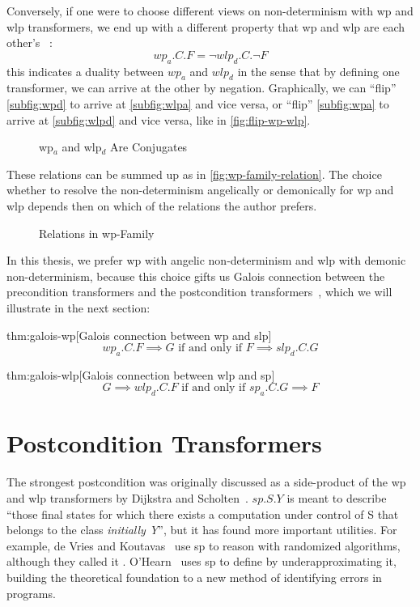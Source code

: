 Conversely, if one were to choose different views on non-determinism with wp and wlp transformers, we end up with a different property that wp and wlp are each other's ~\cite{dijkstra76,zhang22}: 
$$ wp_a.C.F = \neg wlp_d.C.\neg F $$ 
this indicates a duality between $wp_a$ and $wlp_d$ in the sense that by defining one transformer, we can arrive at the other by negation. 
Graphically, we can ``flip'' \autoref{subfig:wpd} to arrive at \autoref{subfig:wlpa} and vice versa, or ``flip'' \autoref{subfig:wpa} to arrive at \autoref{subfig:wlpd} and vice versa, like in \autoref{fig:flip-wp-wlp}. 
\begin{figure}[ht]
	\centering
	
	\caption{wp$_a$ and wlp$_d$ Are Conjugates}
	\label{fig:flip-wp-wlp}
\end{figure}

These relations can be summed up as in \autoref{fig:wp-family-relation}. 
The choice whether to resolve the non-determinism angelically or demonically for wp and wlp depends then on which of the relations the author prefers. 
\begin{figure}[ht]
	\centering
	
	\caption{Relations in wp-Family}
	\label{fig:wp-family-relation}
\end{figure}

In this thesis, we prefer wp with angelic non-determinism and wlp with demonic non-determinism, because this choice gifts us Galois connection between the precondition transformers and the postcondition transformers~\cite{zhang22}, which we will illustrate in the next section: 
\begin{theorem}{thm:galois-wp}[Galois connection between wp and slp]
	$$wp_a.C.F \implies G \text{ if and only if }F\implies slp_d.C.G$$
\end{theorem}

\begin{theorem}{thm:galois-wlp}[Galois connection between wlp and sp]
	$$G \implies wlp_d.C.F \text{ if and only if } sp_a.C.G\implies F$$
\end{theorem}

\section{Postcondition Transformers}
The strongest postcondition was originally discussed as a side-product of the wp and wlp transformers by Dijkstra and Scholten~\cite{dijkstra90}. 
$sp.S.Y$ is meant to describe ``those final states for which there exists a computation under control of S that belongs to the class \textit{initially Y}'', but it has found more important utilities. 
For example, de Vries and Koutavas~\cite{vries11} use sp to reason with randomized algorithms, although they called it . 
O'Hearn~\cite{ohearn2020IncorrectnessLogic} uses sp to define  by underapproximating it, building the theoretical foundation to a new method of identifying errors in programs. 

